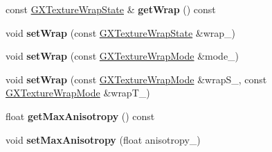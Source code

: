 \begin{DoxyCompactItemize}
\item 
const \hyperlink{class_magnum_1_1_g_x_texture_wrap_state}{G\+X\+Texture\+Wrap\+State} \& {\bfseries get\+Wrap} () const \hypertarget{class_magnum_1_1_g_x_texture_aa8b894f04c3e8bcff356a04d6c421178}{}\label{class_magnum_1_1_g_x_texture_aa8b894f04c3e8bcff356a04d6c421178}

\item 
void {\bfseries set\+Wrap} (const \hyperlink{class_magnum_1_1_g_x_texture_wrap_state}{G\+X\+Texture\+Wrap\+State} \&wrap\+\_\+)\hypertarget{class_magnum_1_1_g_x_texture_a3ab4d9befe8ddf20b9ad62c8346a22b8}{}\label{class_magnum_1_1_g_x_texture_a3ab4d9befe8ddf20b9ad62c8346a22b8}

\item 
void {\bfseries set\+Wrap} (const \hyperlink{class_magnum_1_1_g_x_texture_wrap_mode}{G\+X\+Texture\+Wrap\+Mode} \&mode\+\_\+)\hypertarget{class_magnum_1_1_g_x_texture_a5aa6b3a534e3eaae69aacadc43d65dbe}{}\label{class_magnum_1_1_g_x_texture_a5aa6b3a534e3eaae69aacadc43d65dbe}

\item 
void {\bfseries set\+Wrap} (const \hyperlink{class_magnum_1_1_g_x_texture_wrap_mode}{G\+X\+Texture\+Wrap\+Mode} \&wrap\+S\+\_\+, const \hyperlink{class_magnum_1_1_g_x_texture_wrap_mode}{G\+X\+Texture\+Wrap\+Mode} \&wrap\+T\+\_\+)\hypertarget{class_magnum_1_1_g_x_texture_a79f75badd1d8e0690c3a28682d64c8ba}{}\label{class_magnum_1_1_g_x_texture_a79f75badd1d8e0690c3a28682d64c8ba}

\item 
float {\bfseries get\+Max\+Anisotropy} () const \hypertarget{class_magnum_1_1_g_x_texture_a9b28182a23b3bb3011e656203a1cd42c}{}\label{class_magnum_1_1_g_x_texture_a9b28182a23b3bb3011e656203a1cd42c}

\item 
void {\bfseries set\+Max\+Anisotropy} (float anisotropy\+\_\+)\hypertarget{class_magnum_1_1_g_x_texture_af6c62d2f3c56d695f055bbdfc383ea93}{}\label{class_magnum_1_1_g_x_texture_af6c62d2f3c56d695f055bbdfc383ea93}

\end{DoxyCompactItemize}
